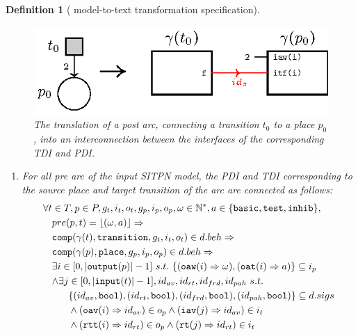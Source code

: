 \documentclass[pdflatex,sn-mathphys]{sn-jnl}%
\theoremstyle{thmstyleone}%
\theoremstyle{thmstyletwo}%
\theoremstyle{thmstylethree}%
\newtheorem{definition}{Definition}%
\begin{document}
\begin{definition}[\hilecop{} model-to-text transformation specification]
  \begin{figure}[h]
    \centering
    \includegraphics[keepaspectratio,width=.7\textwidth]{gen-post-arc.eps}
    \caption{The translation of a post arc, connecting a transition
      $t_0$ to a place $p_0$, into an interconnection between the
      interfaces of the corresponding TDI and PDI.}
    \label{fig:gen-post-arc}
  \end{figure}
  
  \begin{enumerate}[resume]
  \item\label{it:pre-arc} For all pre arc of the input SITPN model,
    the PDI and TDI corresponding to the source place and target
    transition of the arc are connected as follows:
    \begin{equation*}
      \begin{aligned}[t]
        \forall{}t&\in{}T,p\in{}P,g_t,i_t,o_t,g_p,i_p,o_p,\omega\in\mathbb{N}^{*},a\in\{\mathtt{basic},\mathtt{test},\mathtt{inhib}\}, \\
                  & pre(p,t)=\lfloor(\omega,a)\rfloor\Rightarrow \\
                  & \tdiInBeh\Rightarrow \\
                  & \pdiInBeh\Rightarrow\\
                  & \exists{}i\in[0,\vert\mathtt{output}(p)\vert-1]~s.t.~\{(\mathtt{oaw}(i)\Rightarrow\omega),(\mathtt{oat}(i)\Rightarrow{}a)\}\subseteq{}i_p \\
                  & \begin{aligned}[t]
                      \land\exists{}j &\in[0,\vert\mathtt{input}(t)\vert-1],id_{av},id_{rt},id_{frd},id_{pah}~s.t. \\
                                      & \{(id_{av},\mathtt{bool}),(id_{rt},\mathtt{bool}),(id_{frd},\mathtt{bool}),(id_{pah},\mathtt{bool})\}\subseteq{}d.sigs \\
                                      & \land(\mathtt{oav}(i)\Rightarrow{}id_{av})\in{}o_p\land(\mathtt{iav}(j)\Rightarrow{}id_{av})\in{}i_t \\
                                      & \land(\mathtt{rtt}(i)\Rightarrow{}id_{rt})\in{}o_p\land(\mathtt{rt}(j)\Rightarrow{}id_{rt})\in{}i_t \\

\end{aligned}
\end{aligned}
\end{equation*}
\end{enumerate}
\end{definition}
\end{document}
